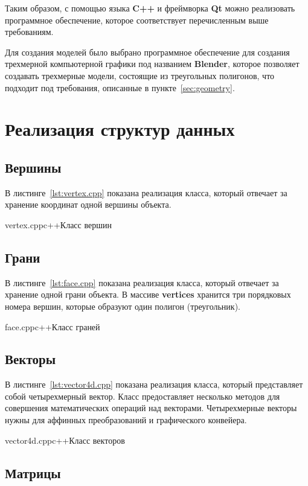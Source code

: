 Таким образом, с помощью языка \textbf{C++} и фреймворка \textbf{Qt} можно реализовать программное обеспечение, которое соответствует перечисленным выше требованиям.

Для создания моделей было выбрано программное обеспечение для создания трехмерной компьютерной графики под названием \textbf{Blender}, которое позволяет создавать трехмерные модели, состоящие из треугольных полигонов, что подходит под требования, описанные в пункте~\ref{sec:geometry}.

\section{Реализация структур данных}

\subsection{Вершины}

В листинге~\ref{lst:vertex.cpp} показана реализация класса, который отвечает за хранение координат одной вершины объекта.

{vertex.cpp}{c++}{Класс вершин}

\subsection{Грани}

В листинге~\ref{lst:face.cpp} показана реализация класса, который отвечает за хранение одной грани объекта. 
В массиве \textbf{vertices} хранится три порядковых номера вершин, которые образуют один полигон (треугольник).

{face.cpp}{c++}{Класс граней}

\subsection{Векторы}

В листинге~\ref{lst:vector4d.cpp} показана реализация класса, который представляет собой четырехмерный вектор. 
Класс предоставляет несколько методов для совершения математических операций над векторами. 
Четырехмерные векторы нужны для аффинных преобразований и графического конвейера.

{vector4d.cpp}{c++}{Класс векторов}

\subsection{Матрицы}

